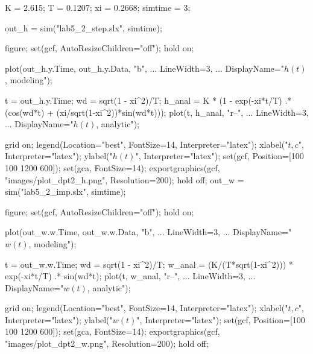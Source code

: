 \begin{matlabcode}
K = 2.615;
T = 0.1207;
xi = 0.2668;
simtime = 3;

out_h = sim("lab5_2_step.slx", simtime);

figure;
set(gcf, AutoResizeChildren="off");
hold on;

plot(out_h.y.Time, out_h.y.Data, "b", ...
     LineWidth=3, ...
     DisplayName="$h(t)$, modeling");

t = out_h.y.Time;
wd = sqrt(1 - xi^2)/T;
h_anal = K * (1 - exp(-xi*t/T) .* (cos(wd*t) + (xi/sqrt(1-xi^2))*sin(wd*t)));
plot(t, h_anal, "r--", ...
     LineWidth=3, ...
     DisplayName="$h(t)$, analytic");

grid on;
legend(Location="best", FontSize=14, Interpreter="latex");
xlabel("$t, c$", Interpreter="latex");
ylabel("$h(t)$", Interpreter="latex");
set(gcf, Position=[100 100 1200 600]);
set(gca, FontSize=14);
exportgraphics(gcf, "images/plot_dpt2_h.png", Resolution=200);
hold off;
out_w = sim("lab5_2_imp.slx", simtime);

figure;
set(gcf, AutoResizeChildren="off");
hold on;

plot(out_w.w.Time, out_w.w.Data, "b", ...
     LineWidth=3, ...
     DisplayName="$w(t)$, modeling");

t = out_w.w.Time;
wd = sqrt(1 - xi^2)/T;
w_anal = (K/(T*sqrt(1-xi^2))) * exp(-xi*t/T) .* sin(wd*t);
plot(t, w_anal, "r--", ...
     LineWidth=3, ...
     DisplayName="$w(t)$, analytic");

grid on;
legend(Location="best", FontSize=14, Interpreter="latex");
xlabel("$t, c$", Interpreter="latex");
ylabel("$w(t)$", Interpreter="latex");
set(gcf, Position=[100 100 1200 600]);
set(gca, FontSize=14);
exportgraphics(gcf, "images/plot_dpt2_w.png", Resolution=200);
hold off;
\end{matlabcode}



